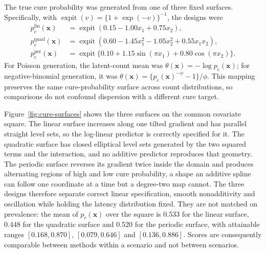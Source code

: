 The true cure probability was generated from one of three fixed surfaces.
Specifically, with $\operatorname{expit}(v)=\{1+\exp(-v)\}^{-1}$, the
designs were
\begin{equation}
	\begin{aligned}
		p_c^{\mathrm{lin}}(\bm{x})
		&=\operatorname{expit}(0.15-1.00x_1+0.75x_2),\\
		p_c^{\mathrm{quad}}(\bm{x})
		&=\operatorname{expit}(0.60-1.45x_1^2-1.05x_2^2+0.55x_1x_2),\\
		p_c^{\mathrm{per}}(\bm{x})
		&=\operatorname{expit}\{0.10+1.15\sin(\pi x_1)+0.80\cos(\pi x_2)\}.
	\end{aligned}
	\label{eq:simulation-cure-surfaces}
\end{equation}
For Poisson generation, the latent-count mean was
$\theta(\bm{x})=-\log p_c(\bm{x})$; for negative-binomial generation, it
was $\theta(\bm{x})=\{p_c(\bm{x})^{-\phi}-1\}/\phi$. This mapping
preserves the same cure-probability surface across count distributions,
so comparisons do not confound dispersion with a different cure target.

Figure~\ref{fig:cure-surfaces} shows the three surfaces on the common
covariate square. The linear surface increases along one tilted gradient
and has parallel straight level sets, so the log-linear predictor is
correctly specified for it. The quadratic surface has closed elliptical
level sets generated by the two squared terms and the interaction, and no
additive predictor reproduces that geometry. The periodic surface reverses
its gradient twice inside the domain and produces alternating regions of
high and low cure probability, a shape an additive spline can follow one
coordinate at a time but a degree-two map cannot. The three designs
therefore separate correct linear specification, smooth nonadditivity and
oscillation while holding the latency distribution fixed. They are not
matched on prevalence: the mean of $p_c(\bm{x})$ over the square is
0.533 for the linear surface, 0.448 for the quadratic surface and 0.520
for the periodic surface, with attainable ranges $[0.168,0.870]$,
$[0.079,0.646]$ and $[0.136,0.886]$. Scores are consequently comparable
between methods within a scenario and not between scenarios.


